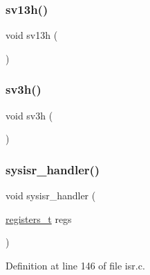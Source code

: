 \subsubsection{\texorpdfstring{sv13h()}{sv13h()}}
{\footnotesize\ttfamily void sv13h (\begin{DoxyParamCaption}{ }\end{DoxyParamCaption})}

\mbox{\label{a00113_ad118f86f4af40a3b4b94bc7c4977e762_ad118f86f4af40a3b4b94bc7c4977e762}} 
\subsubsection{\texorpdfstring{sv3h()}{sv3h()}}
{\footnotesize\ttfamily void sv3h (\begin{DoxyParamCaption}{ }\end{DoxyParamCaption})}

\mbox{\label{a00113_abd1fa375737cd5ecd84c082738e3b195_abd1fa375737cd5ecd84c082738e3b195}} 
\subsubsection{\texorpdfstring{sysisr\+\_\+handler()}{sysisr\_handler()}}
{\footnotesize\ttfamily void sysisr\+\_\+handler (\begin{DoxyParamCaption}\item[{\hyperlink{a00140_adf58dbaf6139b4957c348711f2026957_adf58dbaf6139b4957c348711f2026957}{registers\+\_\+t}}]{regs }\end{DoxyParamCaption})}



Definition at line 146 of file isr.\+c.



